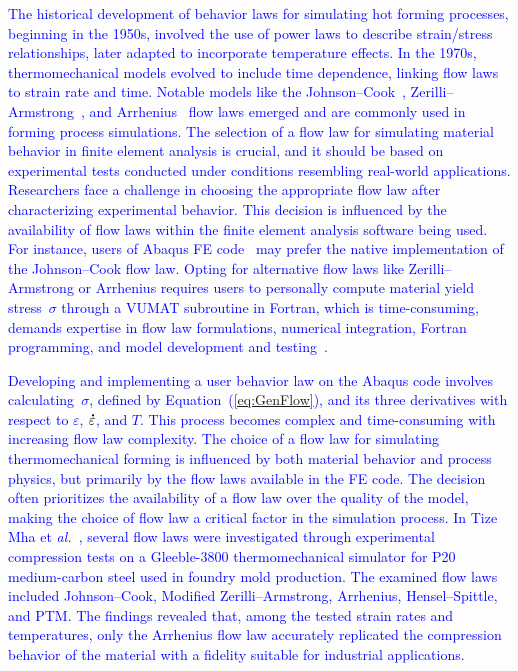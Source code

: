 \documentclass[algorithms,article,submit,pdftex,oneauthors]{Definitions/mdpi}
\makeatletter
\DeclareRobustCommand{\mdot}[1]{\accentset{\mbox{\bfseries .}}{#1}}
\DeclareRobustCommand{\eal}{et \emph{al.}\@\xspace}
\makeatother
\begin{document}
\textcolor{blue}{The historical development of behavior laws for simulating hot forming processes, beginning in the 1950s, involved the use of power laws to describe strain/stress relationships, later adapted to incorporate temperature effects.
In the 1970s, thermomechanical models evolved to include time dependence, linking flow laws to strain rate and time.
Notable models like the Johnson--Cook~\cite{Johnson-1983-CMD}, Zerilli--Armstrong~\cite{Zerilli-1987-DMB}, and Arrhenius~\cite{Jonas-1969} flow laws emerged and are commonly used in forming process simulations.
The selection of a flow law for simulating material behavior in finite element analysis is crucial, and it should be based on experimental tests conducted under conditions resembling real-world applications.
Researchers face a challenge in choosing the appropriate flow law after characterizing experimental behavior.
This decision is influenced by the availability of flow laws within the finite element analysis software being used.
For instance, users of Abaqus FE code~\cite{Abaqus} may prefer the native implementation of the Johnson--Cook flow law.
Opting for alternative flow laws like Zerilli--Armstrong or Arrhenius requires users to personally compute material yield stress~$\sigma$ through a VUMAT subroutine in Fortran, which is time-consuming, demands expertise in flow law formulations, numerical integration, Fortran programming, and model development and testing~\cite{Gao-2007-FRT, Ming-2018-ERV, Liang-2022}.}

\textcolor{blue}{Developing and implementing a user behavior law on the Abaqus code involves calculating~$\sigma$, defined by Equation~(\ref{eq:GenFlow}), and its three derivatives with respect to $\varepsilon$, $\mdot{\varepsilon}$, and $T$.
This process becomes complex and time-consuming with increasing flow law complexity.
The choice of a flow law for simulating thermomechanical forming is influenced by both material behavior and process physics, but primarily by the flow laws available in the FE code.
The decision often prioritizes the availability of a flow law over the quality of the model, making the choice of flow law a critical factor in the simulation process.
In Tize Mha \eal~\cite{Tize-2023-IEP}, several flow laws were investigated through experimental compression tests on a Gleeble-3800 thermomechanical simulator for P20 medium-carbon steel used in foundry mold production.
The examined flow laws included Johnson--Cook, Modified Zerilli--Armstrong, Arrhenius, Hensel--Spittle, and PTM.
The findings revealed that, among the tested strain rates and temperatures, only the Arrhenius flow law accurately replicated the compression behavior of the material with a fidelity suitable for industrial applications.}
\end{document}
